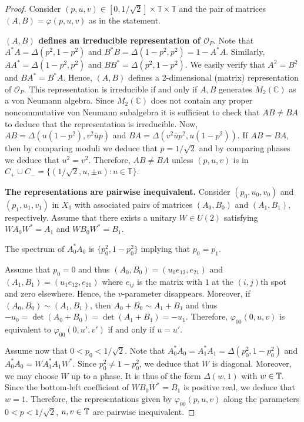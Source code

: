 \documentclass[12pt, a4paper]{amsart}
\def\C{\mathbb{C}}
\def\T{\mathbb{T}}
\newcommand{\CO}[0]{\mathcal{O}} \newcommand{\CP}[0]{\mathcal{P}}
\numberwithin{equation}{section}
\begin{document}
\begin{proof}
Consider $(p,u,v)\in [0,1/\sqrt 2]\times \T\times \T$ and the pair of matrices $(A,B)=\varphi(p,u,v)$ as in the statement.

\textbf{$(A,B)$ defines an irreducible representation of $\CO_P.$}
Note that $A^*A=\Delta(p^2,1-p^2)$ and $B^*B=\Delta(1-p^2,p^2)=1-A^*A$.
Similarly, $AA^*=\Delta(1-p^2,p^2)$ and $BB^*=\Delta(p^2,1-p^2).$
We easily verify that $A^2=B^2$ and $BA^*=B^*A$.
Hence, $(A,B)$ defines a 2-dimensional (matrix) representation of $\CO_P$.
This representation is irreducible if and only if $A,B$ generates $M_2(\C)$ as a von Neumann algebra.
Since $M_2(\C)$ does not contain any proper noncommutative von Neumann subalgebra it is sufficient to check that $AB\neq BA$ to deduce that the representation is irreducible.
Now, $AB=\Delta(u(1-p^2), v^2\overline u p)$ and $BA=\Delta(v^2\overline u p^2 , u (1-p^2)).$
If $AB=BA$, then by comparing moduli we deduce that $p=1/\sqrt 2$ and by comparing phases we deduce that $u^2=v^2.$
Therefore, $AB\neq BA$ unless $(p,u,v)$ is in $C_+\cup C_-=\{(1/\sqrt 2,u,\pm u): u\in\T\}$.

\textbf{The representations are pairwise inequivalent.}
Consider $(p_0,u_0,v_0)$ and $(p_1,u_1,v_1)$ in $X_0$ with associated pairs of matrices $(A_0,B_0)$ and $(A_1,B_1)$, respectively.
Assume that there exists a unitary $W\in U(2)$ satisfying $WA_0W^*=A_1$ and $WB_0W^*=B_1.$

The spectrum of $A_0^*A_0$ is $\{p_0^2,1-p_0^2\}$ implying that $p_0=p_1$.

Assume that $p_0=0$ and thus $(A_0,B_0)=(u_0 e_{12}, e_{21})$ and $(A_1,B_1)=(u_1 e_{12}, e_{21})$ where $e_{ij}$ is the matrix with $1$ at the $(i,j)$th spot and zero elsewhere.
Hence, the $v$-parameter disappears. Moreover, 
if $(A_0,B_0)\sim (A_1,B_1)$, then $A_0+B_0\sim A_1+B_1$ and thus $-u_0=\det(A_0+B_0)=\det(A_1+B_1)=-u_1.$
Therefore, $\varphi_{00}(0,u,v)$ is equivalent to $\varphi_{00}(0,u',v')$ if and only if $u=u'$.

Assume now that $0<p_0<1/\sqrt{2}$. 
Note that $A_0^*A_0=A_1^*A_1=\Delta(p_0^2,1-p_0^2)$ and  $A_0^*A_0=WA_1^*A_1W^*$. 
Since $p_0^2\neq 1-p_0^2$, we deduce that $W$ is diagonal. Moreover, we may choose $W$ up to a phase. It is thus of the form $\Delta(w,1)$ with $w\in \mathbb{T}.$
Since the bottom-left coefficient of $WB_0W^*=B_1$ is positive real, we deduce that $w=1.$
Therefore, the representations given by $\varphi_{00}(p,u,v)$ along the parameters $0<p<1/\sqrt 2$, $u,v\in\mathbb{T}$ are pairwise inequivalent.


\end{proof}
\end{document}
